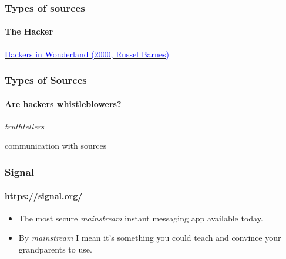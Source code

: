\documentclass[aspectratio=169,usenames,dvipsnames]{beamer}
\begin{document}
\begin{frame}
  \frametitle{Types of sources}
  \framesubtitle{The Hacker}

  \centering

  \footnotesize
  \href{https://youtu.be/aSSqLLeGdHI?t=239}{\textcolor{blue}{Hackers in Wonderland  (2000, Russel Barnes)}}

\end{frame}

\begin{frame}[c]
  \frametitle{Types of Sources}
  \framesubtitle{Are hackers whistleblowers?}

  \pause \large \centering
  \emph{truthtellers}
\end{frame}

\begin{frame}[c]

  \LARGE
  \centering
  communication with sources

\end{frame}

\begin{frame}
  \frametitle{Signal}
  \framesubtitle{\url{https://signal.org/}}

  \begin{itemize}[<+->]
    \item The most secure \emph{mainstream} instant messaging app available
      today.
    \item By \emph{mainstream} I mean it's something you could teach and
      convince your grandparents to use.
  \end{itemize}

\end{frame}
\end{document}

